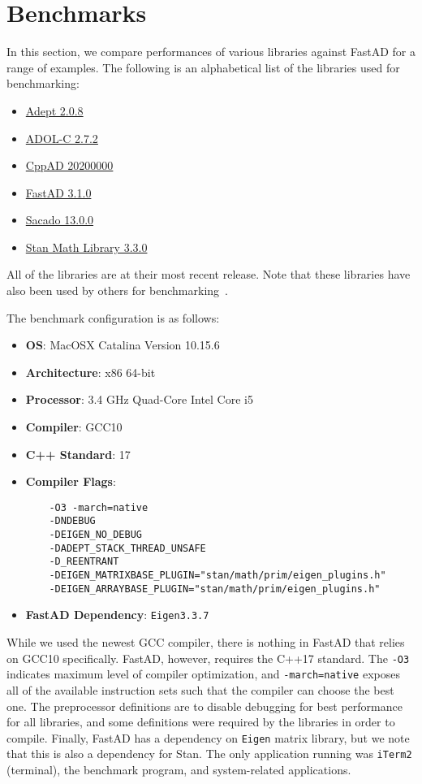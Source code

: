 \section{Benchmarks}\label{sec:benchmark}

In this section, we compare performances of various libraries against FastAD for a range of examples.
The following is an alphabetical list of the libraries used for benchmarking:\@
\begin{itemize}
    \item \href{http://www.met.reading.ac.uk/clouds/adept/}{Adept 2.0.8}
    \item \href{https://github.com/coin-or/ADOL-C}{ADOL-C 2.7.2}
    \item \href{https://coin-or.github.io/CppAD/doc/cppad.htm}{CppAD 20200000}
    \item \href{https://github.com/JamesYang007/FastAD}{FastAD 3.1.0}
    \item \href{https://github.com/trilinos/Trilinos/tree/master/packages/sacado}{Sacado 13.0.0}
    \item \href{https://github.com/stan-dev/math}{Stan Math Library 3.3.0}
\end{itemize}
All of the libraries are at their most recent release.
Note that these libraries have also been used by others for 
benchmarking~\cite{carpenter:2015}\cite{margossian:2018}\cite{hogan:2014}.

The benchmark configuration is as follows:
\begin{itemize}
    \item \textbf{OS}: MacOSX Catalina Version 10.15.6 
    \item \textbf{Architecture}: x86 64-bit
    \item \textbf{Processor}: 3.4 GHz Quad-Core Intel Core i5
    \item \textbf{Compiler}: GCC10
    \item \textbf{C++ Standard}: 17
    \item \textbf{Compiler Flags}: 
\begin{verbatim}
    -O3 -march=native 
    -DNDEBUG 
    -DEIGEN_NO_DEBUG 
    -DADEPT_STACK_THREAD_UNSAFE 
    -D_REENTRANT 
    -DEIGEN_MATRIXBASE_PLUGIN="stan/math/prim/eigen_plugins.h" 
    -DEIGEN_ARRAYBASE_PLUGIN="stan/math/prim/eigen_plugins.h"
\end{verbatim}
    \item \textbf{FastAD Dependency}: \verb|Eigen3.3.7|
\end{itemize}
While we used the newest GCC compiler, there is nothing in FastAD that relies on GCC10 specifically.
FastAD, however, requires the C++17 standard.
The \verb|-O3| indicates maximum level of compiler optimization,
and \verb|-march=native| exposes all of the available instruction sets 
such that the compiler can choose the best one.
The preprocessor definitions are to disable debugging
for best performance for all libraries, and some definitions were required by the libraries in order to compile.
Finally, FastAD has a dependency on \verb|Eigen| matrix library,
but we note that this is also a dependency for Stan.
The only application running was \verb|iTerm2| (terminal),
the benchmark program, and system-related applications.

